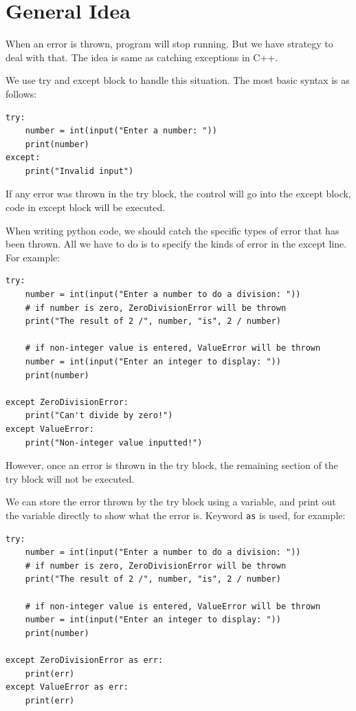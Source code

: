 \documentclass[12pt]{book}
\begin{document}
\section{General Idea}
\label{sec:orga9e2750}
When an error is thrown, program will stop running. But we have strategy to deal with that. The idea is same as catching exceptions in C++.

We use try and except block to handle this situation. The most basic syntax is as follows:
\begin{verbatim}
try:
    number = int(input("Enter a number: "))
    print(number)
except:
    print("Invalid input")
\end{verbatim}
If any error was thrown in the try block, the control will go into the except block, code in except block will be executed.

When writing python code, we should catch the specific types of error that has been thrown. All we have to do is to specify the kinds of error in the except line. For example:
\begin{verbatim}
try:
    number = int(input("Enter a number to do a division: "))
    # if number is zero, ZeroDivisionError will be thrown
    print("The result of 2 /", number, "is", 2 / number)

    # if non-integer value is entered, ValueError will be thrown
    number = int(input("Enter an integer to display: "))
    print(number)

except ZeroDivisionError:
    print("Can't divide by zero!")
except ValueError:
    print("Non-integer value inputted!")
\end{verbatim}
However, once an error is thrown in the try block, the remaining section of the try block will not be executed.

We can store the error thrown by the try block using a variable, and print out the variable directly to show what the error is. Keyword \texttt{as} is used, for example:
\begin{verbatim}
try:
    number = int(input("Enter a number to do a division: "))
    # if number is zero, ZeroDivisionError will be thrown
    print("The result of 2 /", number, "is", 2 / number)

    # if non-integer value is entered, ValueError will be thrown
    number = int(input("Enter an integer to display: "))
    print(number)

except ZeroDivisionError as err:
    print(err)
except ValueError as err:
    print(err)
\end{verbatim}
\end{document}
